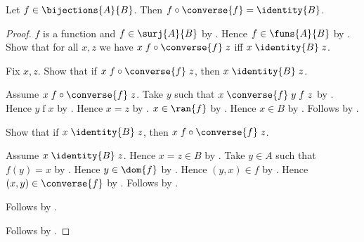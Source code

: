 \begin{theorem}\label{bijection_circ_converse}
    Let $f\in\bijections{A}{B}$.
    Then $f\circ\converse{f}=\identity{B}$.
\end{theorem}
\begin{proof}
    $f$ is a function and $f\in\surj{A}{B}$ by
        .
    Hence $f\in\funs{A}{B}$ by .
    Show that for all $x,z$ we have
        $x\mathrel{f\circ\converse{f}}z$ iff
        $x\mathrel{\identity{B}}z$.
    \begin{subproof}
        Fix $x,z$.
        Show that if $x\mathrel{f\circ\converse{f}}z$, then
            $x\mathrel{\identity{B}}z$.
        \begin{subproof}
            Assume $x\mathrel{f\circ\converse{f}}z$.
            Take $y$ such that
                $x\mathrel{\converse{f}}y\mathrel{f}z$ by
                .
            Hence $y\mathrel{f}x$ by .
            Hence $x=z$ by .
            $x\in\ran{f}$ by .
            Hence $x\in B$ by .
            Follows by .
        \end{subproof}
        Show that if $x\mathrel{\identity{B}}z$, then
            $x\mathrel{f\circ\converse{f}}z$.
        \begin{subproof}
            Assume $x\mathrel{\identity{B}}z$.
            Hence $x=z\in B$ by .
            Take $y\in A$ such that $f(y)=x$ by .
            Hence $y\in\dom{f}$ by .
            Hence $(y,x)\in f$ by .
            Hence $(x,y)\in\converse{f}$ by .
            Follows by .
        \end{subproof}
        Follows by \auto.
    \end{subproof}
    Follows by
        .
\end{proof}
